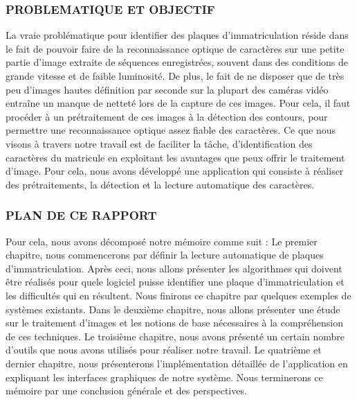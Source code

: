 \documentclass[11pt]{report}
\begin{document}
\subsubsection{PROBLEMATIQUE ET OBJECTIF}
La vraie problématique pour identifier des plaques d’immatriculation réside dans le
fait de pouvoir faire de la reconnaissance optique de caractères sur une petite partie
d’image extraite de séquences enregistrées, souvent dans des conditions de grande vitesse
et de faible luminosité. De plus, le fait de ne disposer que de très peu d’images hautes
définition par seconde sur la plupart des caméras vidéo entraîne un manque de netteté lors
de la capture de ces images. Pour cela, il faut procéder à un prétraitement de ces images à
la détection des contours, pour permettre une reconnaissance optique assez fiable des
caractères.
Ce que nous visons à travers notre travail est de faciliter la tâche, d'identification des
caractères du matricule en exploitant les avantages que peux offrir le traitement d’image.
Pour cela, nous avons développé une application qui consiste à réaliser des prétraitements,
la détection et la lecture automatique des caractères.
\subsubsection{PLAN DE CE RAPPORT}
Pour cela, nous avons décomposé notre mémoire comme suit :
Le premier chapitre, nous commencerons par définir la lecture automatique de
plaques d’immatriculation.
Après ceci, nous allons présenter les algorithmes qui doivent être réalisés pour quele logiciel puisse identifier une plaque d'immatriculation et les difficultés qui en résultent.
Nous finirons ce chapitre par quelques exemples de systèmes existants.
Dans le deuxième chapitre, nous allons présenter une étude sur le traitement
d’images et les notions de base nécessaires à la compréhension de ces techniques.
Le troisième chapitre, nous avons présenté un certain nombre d'outils que nous
avons utilisés pour réaliser notre travail.
Le quatrième et dernier chapitre, nous présenterons l’implémentation détaillée de
l’application en expliquant les interfaces graphiques de notre système.
Nous terminerons ce mémoire par une conclusion générale et des perspectives.


%
%
\end{document}
